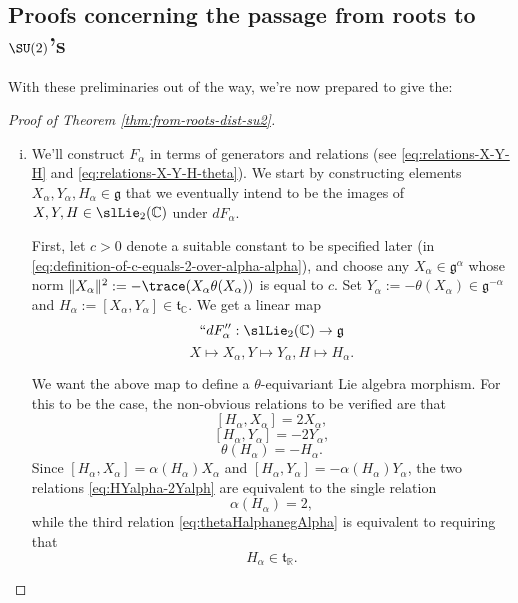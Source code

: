\documentclass[reqno]{amsart} 
\begin{document}
\subsection{Proofs concerning the passage from roots to \texorpdfstring{$\SU(2)$}{SU(2)}'s}\label{sec:proofs-conc-pass}
With these preliminaries out of the way, we're now prepared to give the:
\begin{proof}
[Proof of Theorem \ref{thm:from-roots-dist-su2}]
  \begin{enumerate}
[(i)]
  \item We'll construct $F_\alpha$ in terms of generators and relations (see \eqref{eq:relations-X-Y-H} and \eqref{eq:relations-X-Y-H-theta}).  We start by constructing elements $X_\alpha, Y_\alpha, H_\alpha \in \mathfrak{g}$ that we eventually intend to be the images of $X,Y,H \in \slLie_2(\mathbb{C})$ under $d F_\alpha$.

    First, let $c > 0$ denote a suitable constant to be specified later (in \eqref{eq:definition-of-c-equals-2-over-alpha-alpha}), and choose any $X_\alpha \in \mathfrak{g}^{\alpha}$ whose norm $\|X_\alpha \|^2 := - \trace(X_\alpha \theta(X_\alpha))$ is equal to $c$.  Set $Y_\alpha := - \theta(X_\alpha) \in \mathfrak{g}^{-\alpha}$ and $H_\alpha := [X_\alpha, Y_\alpha] \in \mathfrak{t}_{\mathbb{C}}$.  We get a linear map
    \begin{equation*}
      ``d F_\alpha'' : \slLie_2(\mathbb{C}) \rightarrow \mathfrak{g}
    \end{equation*}
    \begin{equation*}
      X \mapsto X_\alpha, Y \mapsto Y_\alpha, H \mapsto H_\alpha.
    \end{equation*}

    We want the above map to define a $\theta$-equivariant Lie algebra morphism.  For this to be the case, the non-obvious relations to be verified are that
    \begin{equation}\label{eq:HXalpha-2Xalph}
      [H_\alpha, X_\alpha] = 2 X_\alpha,
    \end{equation}
    \begin{equation}\label{eq:HYalpha-2Yalph}
      [H_\alpha, Y_\alpha] = - 2 Y_\alpha,
    \end{equation}
    \begin{equation}\label{eq:thetaHalphanegAlpha}
      \theta(H_\alpha) = - H_\alpha.
    \end{equation}
    Since $[H_\alpha,X_\alpha] = \alpha(H_\alpha) X_\alpha$ and $[H_\alpha,Y_\alpha] = - \alpha(H_\alpha) Y_\alpha$, the two relations \eqref{eq:HYalpha-2Yalph} are equivalent to the single relation
    \begin{equation}\label{eq:alpha-H-alpha-equals-2}
      \alpha(H_\alpha) = 2,
    \end{equation}
    while the third relation \eqref{eq:thetaHalphanegAlpha} is equivalent to requiring that
    \begin{equation}\label{eq:H-alpha-in-t-R}
      H_\alpha \in \mathfrak{t}_{\mathbb{R}}.
    \end{equation}


\end{enumerate}
\end{proof}
\end{document}
